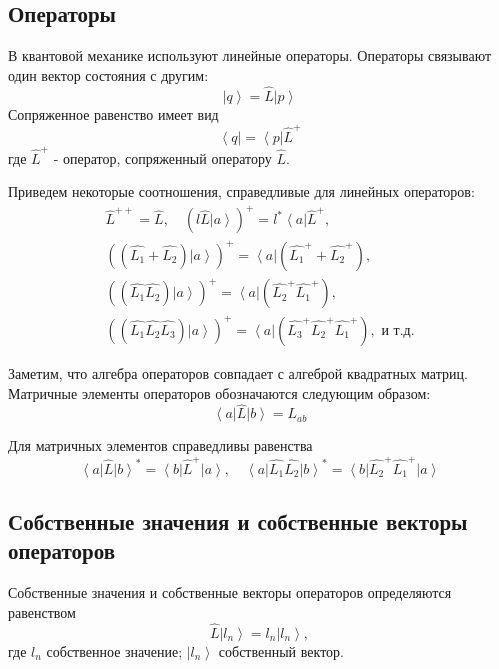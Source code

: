 \subsection{Операторы}
В квантовой механике используют линейные операторы. Операторы
связывают один вектор состояния с другим: 
\begin{equation}
\left| q \right> = \hat{L}\left| p \right>
\label{eqAddDirac_operator_property1}
\end{equation}
Сопряженное равенство имеет вид
\begin{equation}
\left< q \right| = \left< p \right|  \hat{L}^{+}
\label{eqAddDirac_operator_property2}
\end{equation}
где $\hat{L}^{+}$ -  оператор, сопряженный оператору $\hat{L}$.

Приведем некоторые соотношения, справедливые для линейных 
операторов:
\begin{eqnarray}
\hat{L}^{++} = \hat{L}, \quad
\left(l \hat{L} \left| a \right> \right)^{+} = 
l^{*} \left< a \right| \hat{L}^{+}, 
\nonumber \\
\left(\left(\hat{L_1} + \hat{L_2} \right) \left| a \right> \right)^{+} = 
\left< a \right| \left(\hat{L_1}^{+} + \hat{L_2}^{+} \right), 
\nonumber \\
\left(\left(\hat{L_1} \hat{L_2} \right) \left| a \right> \right)^{+} = 
\left< a \right| \left(\hat{L_2}^{+} \hat{L_1}^{+} \right),
\nonumber \\
\left(\left(\hat{L_1} \hat{L_2} \hat{L_3}\right) \left| a \right> \right)^{+} = 
\left< a \right| \left(\hat{L_3}^{+} \hat{L_2}^{+} \hat{L_1}^{+} \right), 
\mbox{ и т.д.}
\label{eqAddDirac_propert}
\end{eqnarray}

Заметим, что алгебра операторов совпадает с алгеброй квадратных
матриц. Матричные элементы операторов обозначаются следующим образом: 
\begin{equation}
\left<a\right|\hat{L}\left|b\right> = L_{ab}
\end{equation}

Для матричных элементов справедливы равенства
\begin{equation}
\left<a\right|\hat{L}\left|b\right>^{*} = 
\left<b\right|\hat{L}^{+}\left|a\right>, \quad
\left<a\right|\hat{L_1}\hat{L_2}\left|b\right>^{*} = 
\left<b\right|\hat{L_2}^{+}\hat{L_1}^{+}\left|a\right>
\end{equation}


\subsection{Собственные  значения  и  собственные  векторы  операторов} 
Собственные значения и собственные векторы операторов определяются равенством
\begin{equation}
\hat{L} \left|l_n\right> = l_n \left|l_n\right>,
\end{equation}
где $l_n$ собственное значение; $\left|l_n\right>$ собственный вектор.

